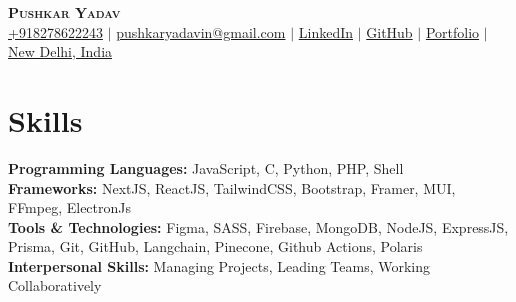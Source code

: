 \documentclass[letterpaper,11pt]{article}
\makeatletter
\newcommand{\resumeEducationHeading}[4]{
  \vspace{-2pt}\item
    \begin{tabular*}{0.97\textwidth}[t]{l@{\extracolsep{\fill}}r}
      \textbf{#1} & #2 \\
      \textit{\small#3} & \textit{\small #4} \\
    \end{tabular*}\vspace{-5pt}
}
\newcommand{\resumeSubHeadingListStart}{\begin{itemize}[leftmargin=0.15in, label={}]}
\newcommand{\resumeSubHeadingListEnd}{\end{itemize}}
\makeatother
\begin{document}

\begin{center}
    \textbf{\Huge \scshape Pushkar Yadav} \\ \vspace{3pt}
    \small
    \faMobile \hspace{.5pt} \href{tel:918278622243}{+918278622243}
    $|$
    \faAt \hspace{.5pt} \href{mailto:pushkaryadavin@gmail.com}{pushkaryadavin@gmail.com}
    $|$
    \faLinkedinSquare \hspace{.5pt} \href{https://www.linkedin.com/in/pushkarydv/}{LinkedIn}
    $|$
    \faGithub \hspace{.5pt} \href{http://github.com/pushkarydv}{GitHub}
    $|$
    \faGlobe \hspace{.5pt} \href{https://pushkaryadav.in}{Portfolio}
    $|$
    \faMapMarker \hspace{.5pt} \href{https://www.google.com/maps/place/new+delhi+india/data=!4m2!3m1!1s0x390cfd5b347eb62d:0x52c2b7494e204dce?sa=X&ved=1t:155783&ictx=111}{New Delhi, India}
\end{center}




\section{Skills}
  \vspace{2pt}
  \resumeSubHeadingListStart
    \small{\item{
         \textbf{Programming Languages:}{ JavaScript, C, Python, PHP, Shell } \\ \vspace{3pt}
         \textbf{Frameworks:}{ NextJS, ReactJS, TailwindCSS, Bootstrap, Framer, MUI, FFmpeg, ElectronJs} \\ \vspace{3pt}
         \textbf{Tools \& Technologies:}{ Figma, SASS, Firebase, MongoDB, NodeJS, ExpressJS, Prisma, Git, GitHub, Langchain, Pinecone, Github Actions, Polaris} \\ \vspace{3pt}
        \textbf{Interpersonal Skills:}{ Managing Projects, Leading Teams, Working Collaboratively} \\ \vspace{3pt}
    }}
  \resumeSubHeadingListEnd
\end{document}
